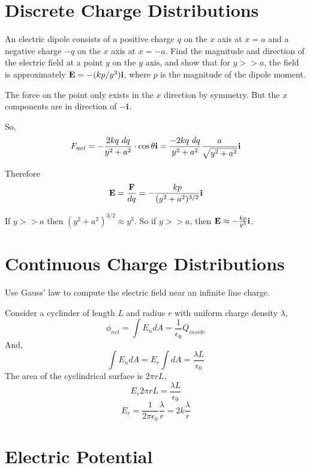 \begin{questions}

  \section{Discrete Charge Distributions}
  
  \question[8] An electric dipole consists of a positive charge $q$ on
  the $x$ axis at $x = a$ and a negative charge $-q$ on the $x$ axis
  at $x = -a$. Find the magnitude and direction of the electric field
  at a point $y$ on the $y$ axis, and show that for $y >> a$, the
  field is approximately ${\bf E} = -(kp/y^3){\bf i}$, where $p$ is
  the magnitude of the dipole moment.

  \begin{solution}
    The force on the point only exists in the $x$ direction by
    symmetry. But the $x$ components are in direction of $-{\bf i}$.

    So,
    $$F_{net} = -\frac{2kq\ dq}{y^2 + a^2} \cdot \cos \theta {\bf i}
    = \frac{-2kq\  dq}{y^2+a^2}\frac{a}{\sqrt{y^2 + a^2}} {\bf i}$$

    Therefore
    $${\bf E} = \frac{ {\bf F} }{ dq } = - \frac{kp}{ (y^2+a^2)^{3/2}
    } {\bf i}$$

    If $y >> a$ then $(y^2 + a^2)^{3/2} \approx y^3$.
    So if $y >> a$, then ${\bf E} \approx - \frac{kp}{y^3} {\bf i}$.
  \end{solution}

  \section{Continuous Charge Distributions}

  \question[8] Use Gauss' law to compute the electric field near an
  infinite line charge.

  \begin{solution}
    Consider a cyclinder of length $L$ and radius $r$ with uniform
    charge density $\lambda$,
    $$\phi_{net} = \int E_n dA = \frac{1}{\epsilon_0} Q_{inside}$$
    And,
    $$\int E_n dA = E_r \int dA = \frac{\lambda L}{\epsilon_0}$$
    The area of the cyclindrical surface is $2\pi r L$,
    $$E_r 2\pi r L = \frac{\lambda L}{\epsilon_0}$$
    $$E_r = \frac{1}{2\pi \epsilon_0} \frac{\lambda}{r} = 2k \frac{\lambda}{r}$$
  \end{solution}

  \section{Electric Potential}


\end{questions}
